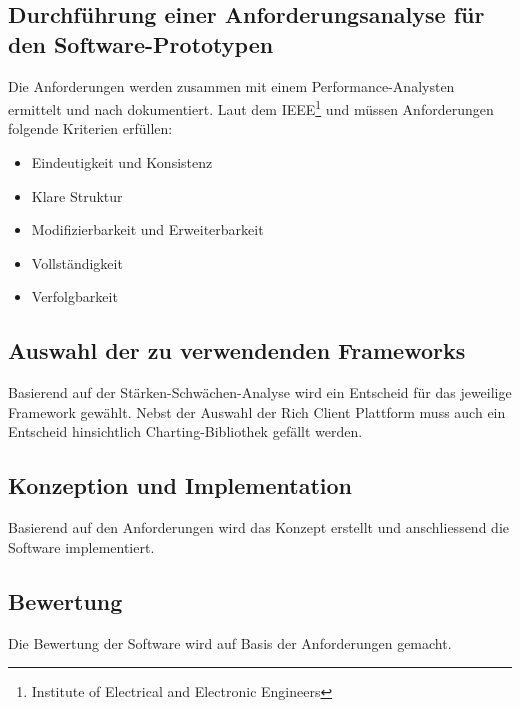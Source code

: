 \subsection{Durchführung einer Anforderungsanalyse für den Software-Prototypen}
Die Anforderungen werden zusammen mit einem Performance-Analysten ermittelt und nach \cite[4.3.2 Angepasste Standardinhalte]{pohl2010basiswissen} dokumentiert. Laut dem IEEE\footnote{Institute of Electrical and Electronic Engineers} und \cite[4.5 Qualitätskriterien für das Anforderungsdokument]{pohl2010basiswissen} müssen Anforderungen folgende Kriterien erfüllen:
\begin{itemize}
	\item Eindeutigkeit und Konsistenz
	\item Klare Struktur
	\item Modifizierbarkeit und Erweiterbarkeit
	\item Vollständigkeit
	\item Verfolgbarkeit
\end{itemize}
\subsection{Auswahl der zu verwendenden Frameworks}
Basierend auf der Stärken-Schwächen-Analyse wird ein Entscheid für das jeweilige Framework gewählt. Nebst der Auswahl der Rich Client Plattform muss auch ein Entscheid hinsichtlich Charting-Bibliothek gefällt werden.

\subsection{Konzeption und Implementation}
Basierend auf den Anforderungen wird das Konzept erstellt und anschliessend die Software implementiert. 

\subsection{Bewertung}
Die Bewertung der Software wird auf Basis der Anforderungen gemacht.



